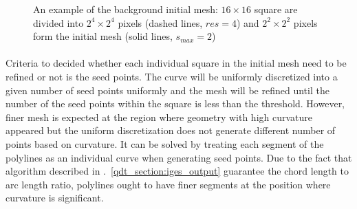 \begin{figure}[h!]
    \centering
    \caption{An example of the background initial mesh: $16 \times 16$ square are divided into $2^4 \times 2^4$ pixels (dashed lines, $res=4$) and $2^2 \times 2^2$ pixels form the initial mesh (solid lines, $s_{max}=2$)}
    \label{qdt_fig:qdt_initial_mesh}
\end{figure}

\paragraph{}
Criteria to decided whether each individual square in the initial mesh need to be refined or not is the seed points.
The curve will be uniformly discretized into a given number of seed points uniformly and the mesh will be refined until the number of the seed points within the square is less than the threshold.
However, finer mesh is expected at the region where geometry with high curvature appeared but the uniform discretization does not generate different number of points based on curvature.
It can be solved by treating each segment of the polylines as an individual curve when generating seed points.
Due to the fact that algorithm described in .~\ref{qdt_section:iges_output} guarantee the chord length to arc length ratio, polylines ought to have finer segments at the position where curvature is significant.

